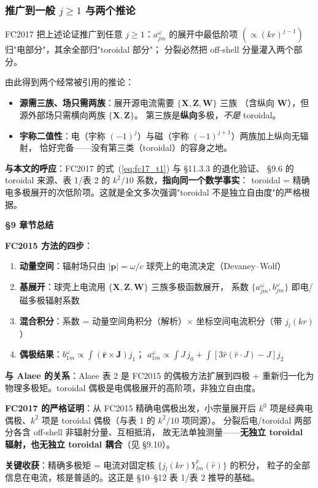 \subsubsection{推广到一般 $j\ge1$ 与两个推论}

FC2017 把上述论证推广到任意 $j\ge1$：$a^\omega_{jm}$ 的展开中最低阶项
$(\propto(kr)^{j-1})$ 归"电部分"，其余全部归"toroidal 部分"；
分裂必然把 off-shell 分量灌入两个部分。

由此得到两个经常被引用的推论：
\begin{itemize}
  \item \textbf{源需三族、场只需两族}：展开源电流需要 $\{\mathbf{X},\mathbf{Z},\mathbf{W}\}$ 三族
    （含纵向 $\mathbf{W}$），但源外部场只需横向两族 $\{\mathbf{X},\mathbf{Z}\}$。
    第三族是\textbf{纵向}多极，\emph{不是} toroidal。
  \item \textbf{宇称二值性}：电（宇称 $(-1)^j$）与磁（宇称 $(-1)^{j+1}$）两族加上纵向无辐射，
    恰好完备——没有第三类（toroidal）的容身之地。
\end{itemize}

\begin{noteworthy}
\textbf{与本文的呼应}：FC2017 的式~(\ref{eq:fc17_t1}) 与 \S11.3.3 的退化验证、
\S9.6 的 toroidal 来源、表 1/表 2 的 $k^2/10$ 系数，\textbf{指向同一个数学事实}：
toroidal = 精确电多极展开的次低阶项。这就是全文多次强调"toroidal 不是独立自由度"的严格根据。
\end{noteworthy}

\begin{chaptersummary}

\textbf{\S9 章节总结}

\textbf{FC2015 方法的四步}：
\begin{enumerate}
  \item \textbf{动量空间}：辐射场只由 $|\mathbf{p}|=\omega/c$ 球壳上的电流决定（Devaney--Wolf）
  \item \textbf{基展开}：球壳上电流用 $\{\mathbf{X},\mathbf{Z},\mathbf{W}\}$ 三族多极函数展开，
    系数 $\{a^\omega_{jm},b^\omega_{jm}\}$ 即电/磁多极辐射系数
  \item \textbf{混合积分}：系数 = 动量空间角积分（解析）$\times$ 坐标空间电流积分（带 $j_l(kr)$）
  \item \textbf{偶极结果}：$b^\omega_{1m}\propto\int(\hat{\mathbf{r}}\times\mathbf{J})j_1$；
    $a^\omega_{1m}\propto\int J\,j_0 + \int[3\hat{r}(\hat{r}\cdot J)-J]j_2$
\end{enumerate}

\textbf{与 Alaee 的关系}：Alaee 表 2 是 FC2015 的偶极方法扩展到四极 +
重新归一化为物理多极矩。toroidal 偶极是电偶极展开的高阶项，非独立自由度。

\textbf{FC2017 的严格证明}：从 FC2015 精确电偶极出发，小宗量展开后
$k^0$ 项是经典电偶极、$k^2$ 项是 toroidal 偶极（与表 1 的 $k^2/10$ 项同源）。
分裂后电/toroidal 两部分各含 off-shell 非辐射分量、互相抵消，
故无法单独测量——\textbf{无独立 toroidal 辐射，也无独立 toroidal 耦合}（见 \S9.10）。

\textbf{关键收获}：精确多极矩 = 电流对固定核 $\{j_l(kr)Y_{lm}^*(\hat{r})\}$ 的积分，
粒子的全部信息在电流，核是普适的。这正是 \S10--\S12 表 1/表 2 推导的基础。

\end{chaptersummary}

\newpage

